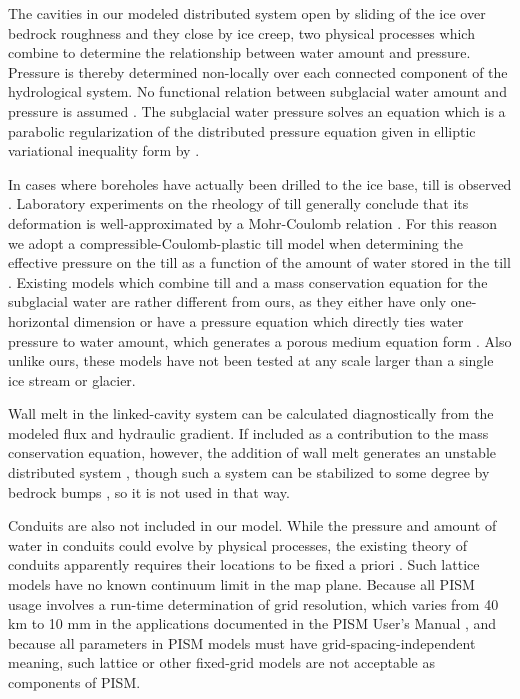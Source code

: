 \documentclass[gmd]{copernicus}   %
\begin{document}
The cavities in our modeled distributed system open by sliding of the ice over bedrock roughness and they close by ice creep, two physical processes which combine to determine the relationship between water amount and pressure.  Pressure is thereby determined non-locally over each connected component of the hydrological system.  No functional relation between subglacial water amount and pressure is assumed \citep[compare][]{FlowersClarke2002_theory}.  The subglacial water pressure solves an equation which is a parabolic regularization of the distributed pressure equation given in elliptic variational inequality form by \cite{Schoofetal2012}.

In cases where boreholes have actually been drilled to the ice base, till is observed \citep{Hookeetal1997,Tulaczyketal2000,TrufferHarrisonEchelmeyer2000,TrufferHarrison2006}.  Laboratory experiments on the rheology of till \citep{Kamb1991,Hookeetal1997,Tulaczyketal2000,TrufferEchelmeyerHarrison2001} generally conclude that its deformation is well-approximated by a Mohr-Coulomb relation \citep{SchoofTill}.  For this reason we adopt a compressible-Coulomb-plastic till model when determining the effective pressure on the till as a function of the amount of water stored in the till \citep{Tulaczyketal2000}.  Existing models which combine till and a mass conservation equation for the subglacial water are rather different from ours, as they either have only one-horizontal dimension \citep{vanderWeletal2013} or have a pressure equation which directly ties water pressure to water amount, which generates a porous medium equation form \citep{FlowersClarke2002_theory,deFleurianetal2014}.  Also unlike ours, these models have not been tested at any scale larger than a single ice stream or glacier.

Wall melt in the linked-cavity system can be calculated diagnostically from the modeled flux and hydraulic gradient.  If included as a contribution to the mass conservation equation, however, the addition of wall melt generates an unstable distributed system \citep{Walder1982}, though such a system can be stabilized to some degree by bedrock bumps \citep{CreytsSchoof2009}, so it is not used in that way.

Conduits are also not included in our model.  While the pressure and amount of water in conduits could evolve by physical processes, the existing theory of conduits apparently requires their locations to be fixed a priori \citep{Schoofmeltsupply,PimentelFlowers2011,Hewittetal2012,Hewitt2013,Werderetal2013}.  Such lattice models have no known continuum limit in the map plane.  Because all PISM usage involves a run-time determination of grid resolution, which varies from 40 km to 10 mm in the applications documented in the PISM User's Manual \citep{pism-user-manual}, and because all parameters in PISM models must have grid-spacing-independent meaning, such lattice or other fixed-grid models are not acceptable as components of PISM.
\end{document}
